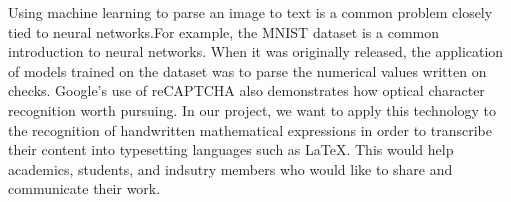 \documentclass[../proposal.tex]{subfiles}
\begin{document}
Using machine learning to parse an image to text is a common problem closely tied to neural networks.For example, the MNIST dataset is a common introduction to neural networks. \cite*{lecun_2010_MNIST} When it was originally released, the application of models trained on the dataset was to parse the numerical values written on checks. Google's use of reCAPTCHA also demonstrates how optical character recognition worth pursuing. \cite*{Ahn_2008_reCAPTCHA} In our project, we want to apply this technology to the recognition of handwritten mathematical expressions in order to transcribe their content into typesetting languages such as LaTeX. This would help academics, students, and indsutry members who would like to share and communicate their work. 
\end{document}
